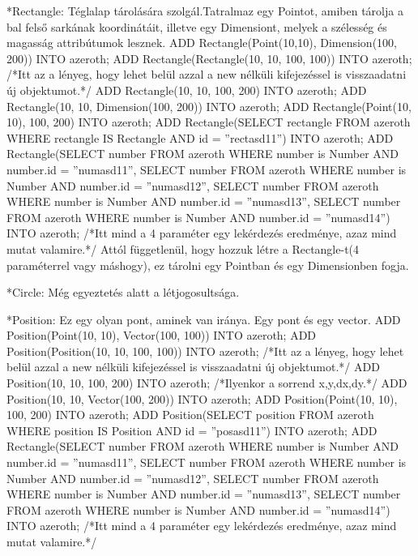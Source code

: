 *Rectangle: Téglalap tárolására szolgál.Tatralmaz egy Pointot, amiben tárolja a bal felső sarkának koordinátáit, illetve egy Dimensiont, melyek a szélesség és magasság attribútumok lesznek.
ADD Rectangle(Point(10,10), Dimension(100, 200)) INTO azeroth;
ADD Rectangle(Rectangle(10, 10, 100, 100)) INTO azeroth; /*Itt az a lényeg, hogy lehet belül azzal a new nélküli kifejezéssel is visszaadatni új objektumot.*/
ADD Rectangle(10, 10, 100, 200) INTO azeroth;
ADD Rectangle(10, 10, Dimension(100, 200)) INTO azeroth;
ADD Rectangle(Point(10, 10), 100, 200) INTO azeroth;
ADD Rectangle(SELECT rectangle FROM azeroth WHERE rectangle IS Rectangle AND id = ”rectasd11”) INTO azeroth;
ADD Rectangle(SELECT number FROM azeroth WHERE number is Number AND number.id = ”numasd11”, SELECT number FROM azeroth WHERE number is Number AND number.id = ”numasd12”, SELECT number FROM azeroth WHERE number is Number AND number.id = ”numasd13”, SELECT number FROM azeroth WHERE number is Number AND number.id = ”numasd14”) INTO azeroth;  /*Itt mind a 4 paraméter egy lekérdezés eredménye, azaz mind mutat valamire.*/
Attól függetlenül, hogy hozzuk létre a Rectangle-t(4 paraméterrel vagy máshogy),  ez tárolni egy Pointban és egy Dimensionben fogja.

*Circle: Még egyeztetés alatt a létjogosultsága.


*Position: Ez egy olyan pont, aminek van iránya. Egy pont és egy vector.
ADD Position(Point(10, 10),  Vector(100, 100)) INTO azeroth;
ADD Position(Position(10, 10, 100, 100)) INTO azeroth; /*Itt az a lényeg, hogy lehet belül azzal a new nélküli kifejezéssel is visszaadatni új objektumot.*/
ADD Position(10, 10, 100, 200) INTO azeroth; /*Ilyenkor a sorrend x,y,dx,dy.*/
ADD Position(10, 10, Vector(100, 200)) INTO azeroth;
ADD Position(Point(10, 10), 100, 200) INTO azeroth;
ADD Position(SELECT position FROM azeroth WHERE position IS Position AND id = ”posasd11”) INTO azeroth;
ADD Rectangle(SELECT number FROM azeroth WHERE number is Number AND number.id = ”numasd11”, SELECT number FROM azeroth WHERE number is Number AND number.id = ”numasd12”, SELECT number FROM azeroth WHERE number is Number AND number.id = ”numasd13”, SELECT number FROM azeroth WHERE number is Number AND number.id = ”numasd14”) INTO azeroth;  /*Itt mind a 4 paraméter egy lekérdezés eredménye, azaz mind mutat valamire.*/


